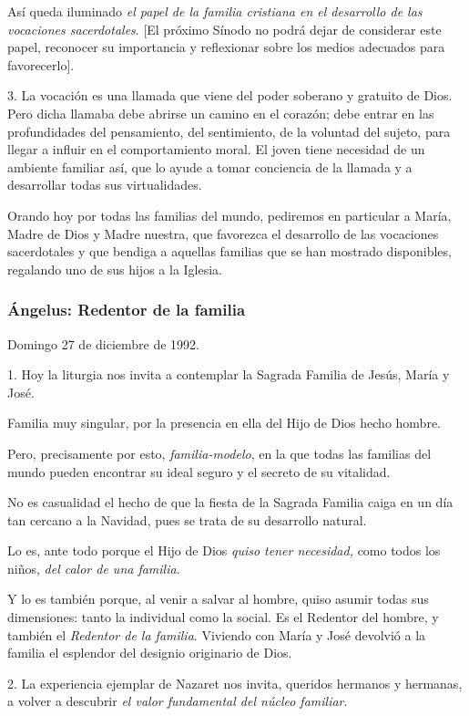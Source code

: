 \begin{body}
\begin{body}
Así queda iluminado \emph{el papel de la familia cristiana en el desarrollo de las vocaciones sacerdotales}. {[}El próximo Sínodo no podrá dejar de considerar este papel, reconocer su importancia y reflexionar sobre los medios adecuados para favorecerlo{]}.

3. La vocación es una llamada que viene del poder soberano y gratuito de Dios. Pero dicha llamaba debe abrirse un camino en el corazón; debe entrar en las profundidades del pensamiento, del sentimiento, de la voluntad del sujeto, para llegar a influir en el comportamiento moral. El joven tiene necesidad de un ambiente familiar así, que lo ayude a tomar conciencia de la llamada y a desarrollar todas sus virtualidades.

Orando hoy por todas las familias del mundo, pediremos en particular a María, Madre de Dios y Madre nuestra, que favorezca el desarrollo de las vocaciones sacerdotales y que bendiga a aquellas familias que se han mostrado disponibles, regalando uno de sus hijos a la Iglesia.

\subsubsection{Ángelus: Redentor de la familia}

Domingo 27 de diciembre de 1992.

1. Hoy la liturgia nos invita a contemplar la Sagrada Familia de Jesús, María y José.

Familia muy singular, por la presencia en ella del Hijo de Dios hecho hombre.

Pero, precisamente por esto, \emph{familia-modelo}, en la que todas las familias del mundo pueden encontrar su ideal seguro y el secreto de su vitalidad.

No es casualidad el hecho de que la fiesta de la Sagrada Familia caiga en un día tan cercano a la Navidad, pues se trata de su desarrollo natural.

Lo es, ante todo porque el Hijo de Dios \emph{quiso tener necesidad,} como todos los niños, \emph{del calor de una familia}.

Y lo es también porque, al venir a salvar al hombre, quiso asumir todas sus dimensiones: tanto la individual como la social. Es el Redentor del hombre, y también el \emph{Redentor de la familia}. Viviendo con María y José devolvió a la familia el esplendor del designio originario de Dios.

2. La experiencia ejemplar de Nazaret nos invita, queridos hermanos y hermanas, a volver a descubrir \emph{el valor fundamental del núcleo familiar}.


\end{body}
\end{body}
